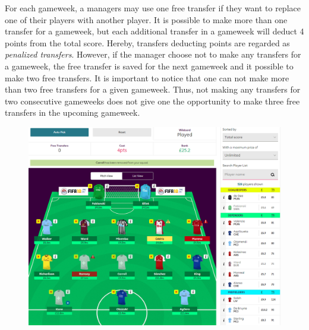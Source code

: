 \newpar

For each gameweek, a managers may use one free transfer if they want to replace one of their players with another player. It is possible to make more than one transfer for a gameweek, but each additional transfer in a gameweek will deduct 4 points from the total score. Hereby, transfers deducting points are regarded as \textit{penalized transfers}. However, if the manager choose not to make any transfers for a gameweek, the free transfer is saved for the next gameweek and it possible to make two free transfers. It is important to notice that one can not make more than two free transfers for a given gameweek. Thus, not making any transfers for two consecutive gameweeks does not give one the opportunity to make three free transfers in the upcoming gameweek. 


\begin{figure}[H]
\centering
\includegraphics[scale=0.35]{fig/fantasyteam1.png}
\label{Figure_2.1}
\label{fig:fantasy_bilde}
\end{figure}

